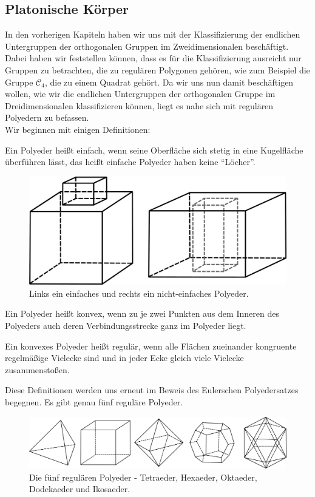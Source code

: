 \subsection{Platonische Körper}
In den vorherigen Kapiteln haben wir uns mit der Klassifizierung der endlichen Untergruppen der orthogonalen Gruppen im Zweidimensionalen beschäftigt. Dabei haben wir feststellen können, dass es für die Klassifizierung ausreicht nur Gruppen zu betrachten, die zu regulären Polygonen gehören, wie zum Beispiel die Gruppe $\mathcal{C}_4$, die zu einem Quadrat gehört. Da wir uns nun damit beschäftigen wollen, wie wir die endlichen Untergruppen der orthogonalen Gruppe im Dreidimensionalen klassifizieren können, liegt es nahe sich mit regulären Polyedern zu befassen.\\
Wir beginnen mit einigen Definitionen:
\begin{defi}
	Ein Polyeder heißt einfach, wenn seine Oberfläche sich stetig in eine Kugelfläche überführen lässt, das heißt einfache Polyeder haben keine \enquote{Löcher}. \citep[211]{Mainzer1988}
\end{defi}
\begin{figure}[H]
    \centering
    \includegraphics[width=0.6\linewidth]{grafiken/einfache_polyeder_vergleich.pdf}
    \caption{Links ein einfaches und rechts ein nicht-einfaches Polyeder.}
\end{figure}
\begin{defi}
	Ein Polyeder heißt konvex, wenn zu je zwei Punkten aus dem Inneren des Polyeders auch deren Verbindungsstrecke ganz im Polyeder liegt. \citep[51]{Mueller2012}
\end{defi}
\begin{defi}
	Ein konvexes Polyeder heißt regulär, wenn alle Flächen zueinander kongruente regelmäßige Vielecke sind und in jeder Ecke gleich viele Vielecke zusammenstoßen. \citep[51]{Mueller2012}
\end{defi}
Diese Definitionen werden uns erneut im Beweis des Eulerschen Polyedersatzes begegnen. Es gibt genau fünf reguläre Polyeder.\\
\begin{figure}[H]
    \centering
    \includegraphics[width=0.9\linewidth]{grafiken/platonische_koerper.pdf}
    \caption{Die fünf regulären Polyeder - Tetraeder, Hexaeder, Oktaeder, Dodekaeder und Ikosaeder.}
    \label{fig:grafiken/Platonische_koerper}
\end{figure}
